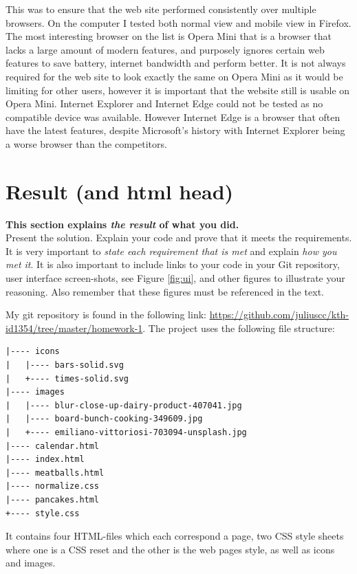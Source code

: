 \documentclass[a4paper]{scrartcl}
\begin{document}
This was to ensure that the web site performed consistently over multiple browsers. On the computer I tested both normal view and mobile view in Firefox. The most interesting browser on the list is Opera Mini that is a browser that lacks a large amount of modern features, and purposely ignores certain web features to save battery, internet bandwidth and perform better. It is not always required for the web site to look exactly the same on Opera Mini as it would be limiting for other users, however it is important that the website still is usable on Opera Mini. Internet Explorer and Internet Edge could not be tested as no compatible device was available. However Internet Edge is a browser that often have the latest features, despite Microsoft's history with Internet Explorer being a worse browser than the competitors.

\section{Result (and html head)}


\textbf{This section explains \textit{the result} of what you did.} \\

\noindent Present the solution. Explain your code and prove that it meets the requirements. It is very important to \textit{state each requirement that is met} and explain \textit{how you met it}. It is also important to include links to your code in your Git repository, user interface screen-shots, see Figure \ref{fig:ui}, and other figures to illustrate your reasoning. Also remember that these figures must be referenced in the text.


My git repository is found in the following link: \newline\href{https://github.com/juliuscc/kth-id1354/tree/master/homework-1}{https://github.com/juliuscc/kth-id1354/tree/master/homework-1}. The project uses the following file structure:

\begin{verbatim}
|---- icons
|   |---- bars-solid.svg
|   +---- times-solid.svg
|---- images
|   |---- blur-close-up-dairy-product-407041.jpg
|   |---- board-bunch-cooking-349609.jpg
|   +---- emiliano-vittoriosi-703094-unsplash.jpg
|---- calendar.html
|---- index.html
|---- meatballs.html
|---- normalize.css
|---- pancakes.html
+---- style.css
\end{verbatim}

\noindent
It contains four HTML-files which each correspond a page, two CSS style sheets where one is a CSS reset and the other is the web pages style, as well as icons and images.
\end{document}
